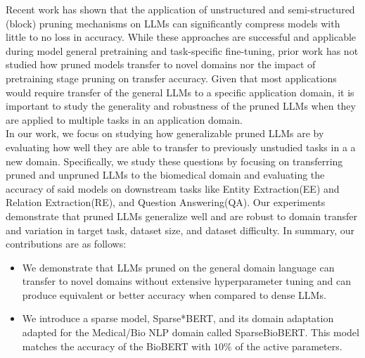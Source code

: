 Recent work \cite{Zafrir2021PruneOF} \cite{Kurti2022TheOB} has shown that the application of unstructured and semi-structured (block) pruning mechanisms on LLMs can significantly compress models with little to no loss in accuracy. While these approaches are successful and applicable during model general pretraining and task-specific fine-tuning, prior work has not studied how pruned models transfer to novel domains nor the impact of pretraining stage pruning on transfer accuracy. Given that most applications would require transfer of the general LLMs to a specific application domain, it is important to study the generality and robustness of the pruned LLMs when they are applied to multiple tasks in an application domain.  \\
In our work, we focus on studying how generalizable pruned LLMs are by evaluating how well they are able to transfer to previously unstudied tasks in a a new domain.
Specifically, we study these questions by focusing on transferring pruned and unpruned LLMs to the biomedical domain and evaluating the accuracy of said models on downstream tasks like Entity Extraction(EE) and Relation Extraction(RE), and Question Answering(QA). Our experiments demonstrate that pruned LLMs generalize well and are robust to domain transfer and variation in target task, dataset size, and dataset difficulty. In summary, our contributions are as follows:
\begin{itemize} 
\item We demonstrate that LLMs pruned on the general domain language can transfer to novel domains without extensive hyperparameter tuning and can produce equivalent or better accuracy when compared to dense LLMs.
\item We introduce a sparse model, Sparse*BERT, and its domain adaptation adapted for the Medical/Bio NLP domain called SparseBioBERT. This model matches the accuracy of the BioBERT with $10\%$ of the active parameters.
\end{itemize}
